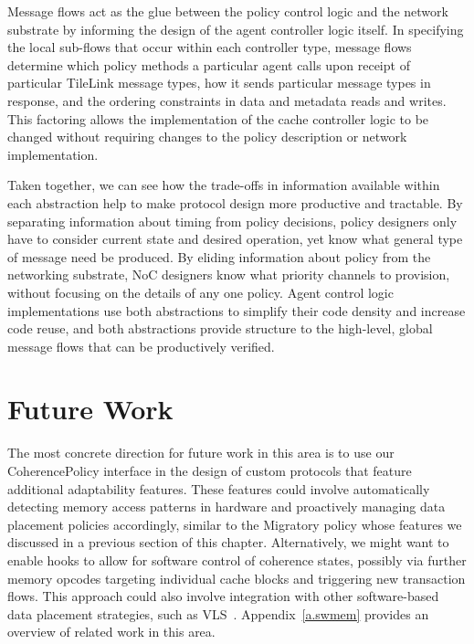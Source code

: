 Message flows act as the glue between the policy control logic and
the network substrate by informing the design of the agent controller logic itself.
In specifying the local sub-flows that occur within each controller type, message flows determine
which policy methods a particular agent calls upon receipt of particular TileLink message types,
how it sends particular message types in response,
and the ordering constraints in data and metadata reads and writes.
This factoring allows the implementation of the cache controller logic
to be changed without requiring changes to the policy description or network implementation.

Taken together, we can see how the trade-offs in information available within each abstraction
help to make protocol design more productive and tractable.
By separating information about timing from policy decisions, policy designers only have to consider
current state and desired operation, yet know what general type of message need be produced.
By eliding information about policy from the networking substrate, NoC designers know what priority channels to provision, without focusing on the details of any one policy.
Agent control logic implementations use both abstractions to simplify their code density and increase code reuse, and
both abstractions provide structure to the high-level, global message flows that can be productively verified.

\section{Future Work}

The most concrete direction for future work in this area is to use our CoherencePolicy interface
in the design of custom protocols that feature additional adaptability features.
These features could involve automatically detecting memory access patterns in hardware
and proactively managing data placement policies accordingly, similar to 
the Migratory policy whose features we discussed in a previous section of this chapter.
Alternatively, we might want to enable hooks to allow for software control of coherence states,
possibly via further memory opcodes targeting individual cache blocks and triggering new transaction flows.
This approach could also involve integration with other software-based data placement strategies, such as VLS~\cite{Cook:EECS-2009-131}.
Appendix~\ref{a.swmem} provides an overview of related work in this area.

